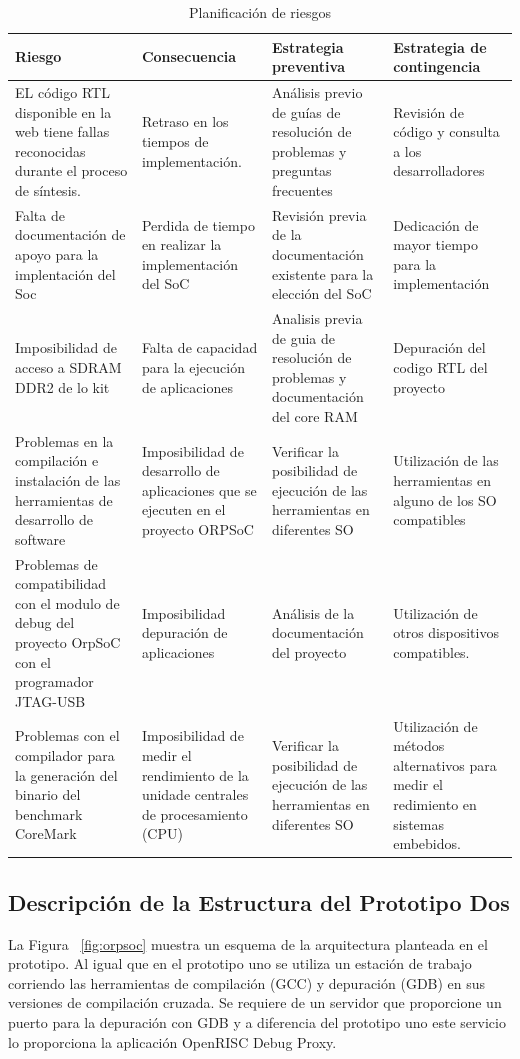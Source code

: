  \begin{table}[h!]
		\centering
		\begin{tabular}{ p{4cm} p{4cm} p{4cm} p{3cm} }
		\hline 
		\rowcolor[gray]{0.8} Riesgo & Consecuencia & Estrategia preventiva & Estrategia de contingencia\\
		\hline
		EL código RTL disponible en la web tiene fallas reconocidas durante el proceso de síntesis.&Retraso en los tiempos de implementación.& Análisis previo de guías de resolución de problemas y preguntas frecuentes & Revisión de código y consulta a los desarrolladores \\		 
		\hline
		Falta de documentación de apoyo para la implentación
del Soc& Perdida de tiempo en realizar la implementación
del SoC & Revisión previa de la documentación existente para la elección del
SoC & Dedicación de mayor tiempo para la implementación\\ 
		\hline
		 Imposibilidad de acceso a SDRAM DDR2 de lo kit & Falta de capacidad para la ejecución de aplicaciones & Analisis previa de guia de resolución de problemas y documentación del core RAM & Depuración del codigo RTL del proyecto\\
		\hline
		Problemas en la compilación e instalación de las herramientas de desarrollo de software & Imposibilidad de desarrollo de aplicaciones que se ejecuten en el proyecto ORPSoC & Verificar la posibilidad de ejecución de las herramientas en diferentes SO & Utilización de las herramientas en alguno de los SO compatibles\\			
		\hline
		Problemas de compatibilidad con el modulo de debug del proyecto OrpSoC con el programador JTAG-USB & Imposibilidad depuración de aplicaciones &Análisis de la documentación del proyecto& Utilización de otros  dispositivos compatibles.\\		
		\hline
		Problemas con el compilador para la generación del binario del benchmark CoreMark & Imposibilidad de medir el rendimiento de la unidade centrales de procesamiento (CPU) & Verificar la posibilidad de ejecución de las herramientas en diferentes SO & Utilización de métodos alternativos para medir el redimiento en sistemas embebidos.\\
		\hline
		\end{tabular}
		\caption{Planificación de riesgos}
		\end{table}


\newpage
		\subsection{Descripción de la Estructura del Prototipo Dos}
		La Figura ~\ref{fig:orpsoc} muestra un esquema de la arquitectura planteada en el prototipo. Al igual que en el prototipo uno se utiliza un estación
		de trabajo corriendo las herramientas de compilación (GCC) y depuración (GDB) en sus versiones de compilación cruzada. Se requiere de un servidor
		que proporcione un puerto para la depuración con GDB y a diferencia del prototipo uno este servicio lo proporciona la aplicación OpenRISC Debug
		Proxy.
		
